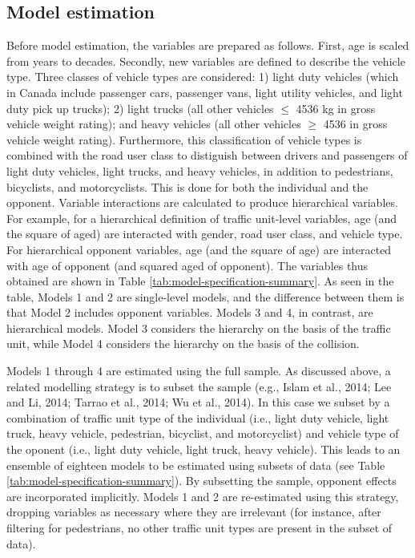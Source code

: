 \documentclass[]{elsarticle} %
\begin{document}
\hypertarget{model-estimation}{%
\subsection{Model estimation}\label{model-estimation}}

Before model estimation, the variables are prepared as follows. First,
age is scaled from years to decades. Secondly, new variables are defined
to describe the vehicle type. Three classes of vehicle types are
considered: 1) light duty vehicles (which in Canada include passenger
cars, passenger vans, light utility vehicles, and light duty pick up
trucks); 2) light trucks (all other vehicles \(\le\) 4536 kg in gross
vehicle weight rating); and heavy vehicles (all other vehicles \(\ge\)
4536 in gross vehicle weight rating). Furthermore, this classification
of vehicle types is combined with the road user class to distiguish
between drivers and passengers of light duty vehicles, light trucks, and
heavy vehicles, in addition to pedestrians, bicyclists, and
motorcyclists. This is done for both the individual and the opponent.
Variable interactions are calculated to produce hierarchical variables.
For example, for a hierarchical definition of traffic unit-level
variables, age (and the square of aged) are interacted with gender, road
user class, and vehicle type. For hierarchical opponent variables, age
(and the square of age) are interacted with age of opponent (and squared
aged of opponent). The variables thus obtained are shown in Table
\ref{tab:model-specification-summary}. As seen in the table, Models 1
and 2 are single-level models, and the difference between them is that
Model 2 includes opponent variables. Models 3 and 4, in contrast, are
hierarchical models. Model 3 considers the hierarchy on the basis of the
traffic unit, while Model 4 considers the hierarchy on the basis of the
collision.

Models 1 through 4 are estimated using the full sample. As discussed
above, a related modelling strategy is to subset the sample (e.g., Islam
et al., 2014; Lee and Li, 2014; Tarrao et al., 2014; Wu et al., 2014).
In this case we subset by a combination of traffic unit type of the
individual (i.e., light duty vehicle, light truck, heavy vehicle,
pedestrian, bicyclist, and motorcyclist) and vehicle type of the oponent
(i.e., light duty vehicle, light truck, heavy vehicle). This leads to an
ensemble of eighteen models to be estimated using subsets of data (see
Table \ref{tab:model-specification-summary}). By subsetting the sample,
opponent effects are incorporated implicitly. Models 1 and 2 are
re-estimated using this strategy, dropping variables as necessary where
they are irrelevant (for instance, after filtering for pedestrians, no
other traffic unit types are present in the subset of data).
\end{document}
